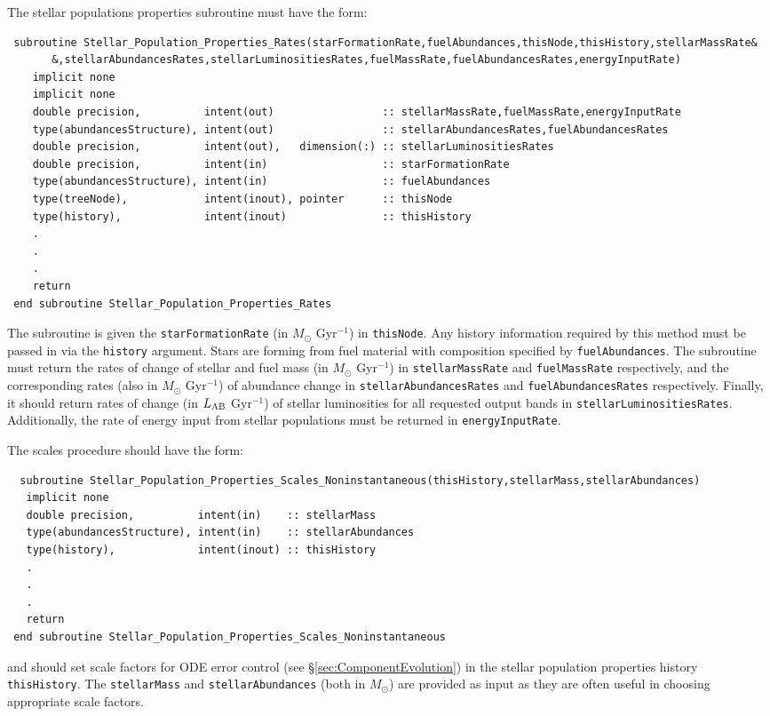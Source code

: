 The stellar populations properties subroutine must have the form:
\begin{verbatim}
 subroutine Stellar_Population_Properties_Rates(starFormationRate,fuelAbundances,thisNode,thisHistory,stellarMassRate&
       &,stellarAbundancesRates,stellarLuminositiesRates,fuelMassRate,fuelAbundancesRates,energyInputRate)
    implicit none
    implicit none
    double precision,          intent(out)                 :: stellarMassRate,fuelMassRate,energyInputRate
    type(abundancesStructure), intent(out)                 :: stellarAbundancesRates,fuelAbundancesRates
    double precision,          intent(out),   dimension(:) :: stellarLuminositiesRates
    double precision,          intent(in)                  :: starFormationRate
    type(abundancesStructure), intent(in)                  :: fuelAbundances
    type(treeNode),            intent(inout), pointer      :: thisNode
    type(history),             intent(inout)               :: thisHistory
    .
    .
    .
    return
 end subroutine Stellar_Population_Properties_Rates
\end{verbatim}
The subroutine is given the {\tt starFormationRate} (in $M_\odot$ Gyr$^{-1}$) in {\tt thisNode}. Any history information required by this method must be passed in via the {\tt history} argument. Stars are forming from fuel material with composition specified by {\tt fuelAbundances}. The subroutine must return the rates of change of stellar and fuel mass (in $M_\odot$ Gyr$^{-1}$) in {\tt stellarMassRate} and {\tt fuelMassRate} respectively, and the corresponding rates (also in $M_\odot$ Gyr$^{-1}$) of abundance change in {\tt stellarAbundancesRates} and {\tt fuelAbundancesRates} respectively. Finally, it should return rates of change (in $L_{\rm AB}$ Gyr$^{-1}$) of stellar luminosities for all requested output bands in {\tt stellarLuminositiesRates}. Additionally, the rate of energy input from stellar populations must be returned in {\tt energyInputRate}.

The scales procedure should have the form:
\begin{verbatim}
  subroutine Stellar_Population_Properties_Scales_Noninstantaneous(thisHistory,stellarMass,stellarAbundances)
   implicit none
   double precision,          intent(in)    :: stellarMass
   type(abundancesStructure), intent(in)    :: stellarAbundances
   type(history),             intent(inout) :: thisHistory
   .
   .
   .
   return
 end subroutine Stellar_Population_Properties_Scales_Noninstantaneous
\end{verbatim}
and should set scale factors for ODE error control (see \S\ref{sec:ComponentEvolution}) in the stellar population properties history {\tt thisHistory}. The {\tt stellarMass} and {\tt stellarAbundances} (both in $M_\odot$) are provided as input as they are often useful in choosing appropriate scale factors.

